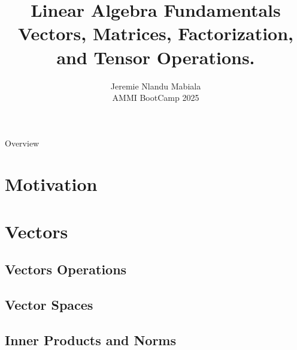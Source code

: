 \documentclass[11pt]{beamer}
\author[Jeremie N. Mabiala]{Jeremie Nlandu Mabiala \\
AMMI BootCamp 2025}
\title{Linear Algebra Fundamentals \\
\vspace*{.8cm}
Vectors, Matrices, Factorization, and Tensor Operations.}
\institute{African Masters of Machine Intelligence}
\begin{document}

\begin{frame}
    \titlepage
\end{frame}

\begin{frame}[allowframebreaks,t]{Overview}
    \tableofcontents[pausesections]
\end{frame}




\section{Motivation}


\section{Vectors}


\subsection{Vectors Operations}


\subsection{Vector Spaces}


\subsection{Inner Products and Norms}

\end{document}
